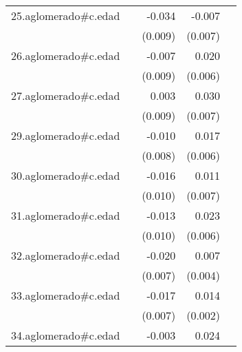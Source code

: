 {\begin{longtable}{l*{4}{D{.}{.}{-1}}}
\addlinespace
25.aglomerado#c.edad&                     &      -0.034\sym{***}&      -0.007         &                     \\
            &                     &     (0.009)         &     (0.007)         &                     \\
\addlinespace
26.aglomerado#c.edad&                     &      -0.007         &       0.020\sym{**} &                     \\
            &                     &     (0.009)         &     (0.006)         &                     \\
\addlinespace
27.aglomerado#c.edad&                     &       0.003         &       0.030\sym{***}&                     \\
            &                     &     (0.009)         &     (0.007)         &                     \\
\addlinespace
29.aglomerado#c.edad&                     &      -0.010         &       0.017\sym{**} &                     \\
            &                     &     (0.008)         &     (0.006)         &                     \\
\addlinespace
30.aglomerado#c.edad&                     &      -0.016         &       0.011         &                     \\
            &                     &     (0.010)         &     (0.007)         &                     \\
\addlinespace
31.aglomerado#c.edad&                     &      -0.013         &       0.023\sym{***}&                     \\
            &                     &     (0.010)         &     (0.006)         &                     \\
\addlinespace
32.aglomerado#c.edad&                     &      -0.020\sym{**} &       0.007         &                     \\
            &                     &     (0.007)         &     (0.004)         &                     \\
\addlinespace
33.aglomerado#c.edad&                     &      -0.017\sym{**} &       0.014\sym{***}&                     \\
            &                     &     (0.007)         &     (0.002)         &                     \\
\addlinespace
34.aglomerado#c.edad&                     &      -0.003         &       0.024\sym{***}&                     \\

\end{longtable}}
